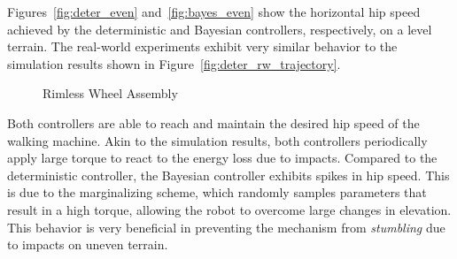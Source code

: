 Figures~\ref{fig:deter_even} and~\ref{fig:bayes_even} show the horizontal hip
speed achieved by the deterministic and Bayesian controllers, respectively, on
a level terrain.
%
The real-world experiments exhibit very similar behavior to the simulation
results shown in Figure~\ref{fig:deter_rw_trajectory}.
%
\begin{figure}
    \vspace{-5mm}
     \begin{center}
     \vspace{-5mm}
     \end{center}
     \caption{Rimless Wheel Assembly}
     \label{fig:hardware}
     \vspace{-5mm}
\end{figure}
%
Both controllers are able to reach and maintain the desired hip speed of the
walking machine.
%
Akin to the simulation results, both controllers periodically apply large torque
to react to the energy loss due to impacts.
%
Compared to the deterministic controller, the Bayesian controller exhibits spikes
in hip speed.
%
This is due to the marginalizing scheme, which randomly samples parameters that
result in a high torque, allowing the robot to overcome large changes in elevation.
%
This behavior is very beneficial in preventing the mechanism from
\textit{stumbling} due to impacts on uneven terrain. 
%
%

